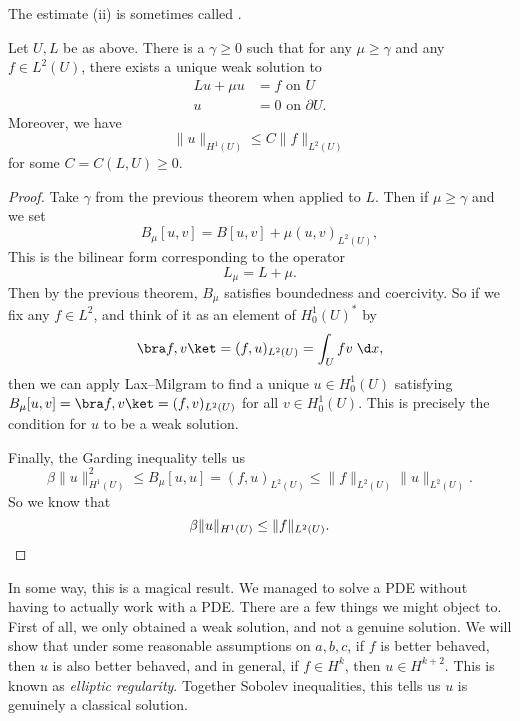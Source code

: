 \documentclass[a4paper]{article}
\begin{document}
The estimate (ii) is sometimes called . %

\begin{thm}
  Let $U, L$ be as above. There is a $\gamma \geq 0$ such that for any $\mu \geq \gamma$ and any $f \in L^2(U)$, there exists a unique weak solution to
  \begin{align*}
    Lu + \mu u &= f \text{ on $U$}\\
    u &= 0 \text{ on $\partial U$}.
  \end{align*}
  Moreover, we have
  \[
    \|u\|_{H^1(U)} \leq C \|f\|_{L^2(U)}
  \]
  for some $C = C(L, U) \geq 0$.
\end{thm}

\begin{proof}
  Take $\gamma$ from the previous theorem when applied to $L$. Then if $\mu \geq \gamma$ and we set
  \[
    B_\mu[u, v] = B[u, v] + \mu (u, v)_{L^2(U)},
  \]
  This is the bilinear form corresponding to the operator
  \[
    L_\mu = L + \mu.
  \]
  Then by the previous theorem, $B_\mu$ satisfies boundedness and coercivity. So if we fix any $f \in L^2$, and think of it as an element of $H_0^1(U)^*$ by
  \[
    \bra f, v \ket = (f, u)_{L^2(U)} = \int_U fv\;\d x,
  \]
  then we can apply Lax--Milgram to find a unique $u \in H_0^1(U)$ satisfying $B_\mu[u, v] = \bra f, v\ket = (f, v)_{L^2(U)}$ for all $v \in H_0^1(U)$. This is precisely the condition for $u$ to be a weak solution.

  Finally, the Garding inequality tells us
  \[
    \beta \|u\|_{H^1(U)}^2 \leq B_\mu[u, u] = (f, u)_{L^2(U)} \leq \|f\|_{L^2(U)} \|u\|_{L^2(U)}.
  \]
  So we know that
  \[
    \beta \|u\|_{H^1(U)} \leq \|f\|_{L^2(U)}.\qedhere
  \]
\end{proof}
In some way, this is a magical result. We managed to solve a PDE without having to actually work with a PDE. There are a few things we might object to. First of all, we only obtained a weak solution, and not a genuine solution. We will show that under some reasonable assumptions on $a, b, c$, if $f$ is better behaved, then $u$ is also better behaved, and in general, if $f \in H^k$, then $u \in H^{k + 2}$. This is known as \emph{elliptic regularity}. Together Sobolev inequalities, this tells us $u$ is genuinely a classical solution.
\end{document}

